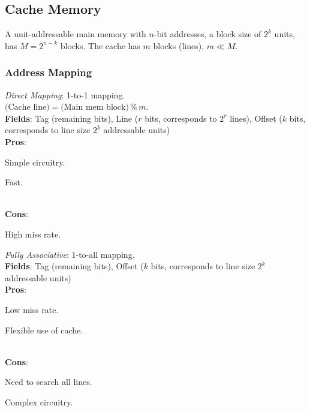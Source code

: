 \subsection*{Cache Memory}
A unit-addressable main memory with $n$-bit addresses, a block size of $2^k$ units, has $M=2^{n-k}$ blocks.
The cache has $m$ blocks (lines), $m \ll M$.

\subsubsection*{Address Mapping}

\emph{Direct Mapping}: 1-to-1 mapping.\\
$\text{(Cache line)} = \text{(Main mem block)}\,\%\,m$.\\
\textbf{Fields}: Tag (remaining bits), Line ($r$ bits, corresponds to $2^r$ lines), Offset ($k$ bits, corresponds to line size $2^k$ addressable units)\\
\textbf{Pros}:
\begin{enuminline}
    \item Simple circuitry.
    \item Fast.
\end{enuminline}\\
\textbf{Cons}:
\begin{enuminline}
    \item High miss rate.
\end{enuminline}

\emph{Fully Associative}: 1-to-all mapping.\\
\textbf{Fields}: Tag (remaining bits), Offset ($k$ bits, corresponds to line size $2^k$ addressable units)\\
\textbf{Pros}:
\begin{enuminline}
    \item Low miss rate.
    \item Flexible use of cache.
\end{enuminline}\\
\textbf{Cons}:
\begin{enuminline}
    \item Need to search all lines.
    \item Complex circuitry.
\end{enuminline}

